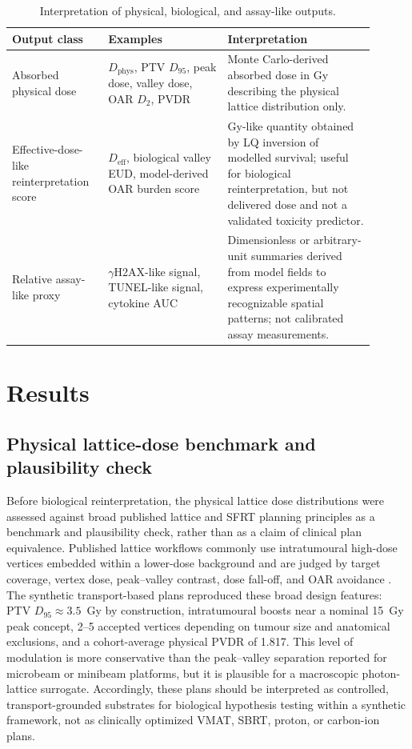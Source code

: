 \documentclass[10pt,a4paper]{article}
\newcommand{\Deff}{D_{\mathrm{eff}}}
\newcommand{\Dphys}{D_{\mathrm{phys}}}
\begin{document}
\begin{table}[H]
\centering
\caption{Interpretation of physical, biological, and assay-like outputs.}
\label{tab:definitions}
\footnotesize
\begin{tabular}{p{0.23\linewidth}p{0.30\linewidth}p{0.37\linewidth}}
\toprule
Output class & Examples & Interpretation \\
\midrule
Absorbed physical dose & $\Dphys$, PTV $D_{95}$, peak dose, valley dose, OAR $D_2$, PVDR & Monte Carlo-derived absorbed dose in Gy describing the physical lattice distribution only. \\
Effective-dose-like reinterpretation score & $\Deff$, biological valley EUD, model-derived OAR burden score & Gy-like quantity obtained by LQ inversion of modelled survival; useful for biological reinterpretation, but not delivered dose and not a validated toxicity predictor. \\
Relative assay-like proxy & $\gamma$H2AX-like signal, TUNEL-like signal, cytokine AUC & Dimensionless or arbitrary-unit summaries derived from model fields to express experimentally recognizable spatial patterns; not calibrated assay measurements. \\
\bottomrule
\end{tabular}
\end{table}
\section{Results}
\subsection{Physical lattice-dose benchmark and plausibility check}

Before biological reinterpretation, the physical lattice dose distributions were assessed against broad published lattice and SFRT planning principles as a benchmark and plausibility check, rather than as a claim of clinical plan equivalence. Published lattice workflows commonly use intratumoural high-dose vertices embedded within a lower-dose background and are judged by target coverage, vertex dose, peak--valley contrast, dose fall-off, and OAR avoidance \cite{wu2020technical,duriseti2021lattice,kavanaugh2022planning,duriseti2022phase,grams2023clinical,iori2023lattice}. The synthetic transport-based plans reproduced these broad design features: PTV $D_{95}\approx3.5$~Gy by construction, intratumoural boosts near a nominal 15~Gy peak concept, 2--5 accepted vertices depending on tumour size and anatomical exclusions, and a cohort-average physical PVDR of 1.817. This level of modulation is more conservative than the peak--valley separation reported for microbeam or minibeam platforms, but it is plausible for a macroscopic photon-lattice surrogate. Accordingly, these plans should be interpreted as controlled, transport-grounded substrates for biological hypothesis testing within a synthetic framework, not as clinically optimized VMAT, SBRT, proton, or carbon-ion plans.
\end{document}
